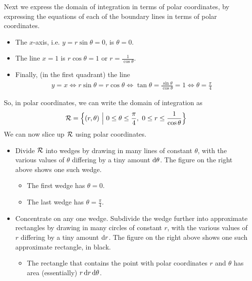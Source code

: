 \begin{eg}
\begin{efig}
\begin{center}
\end{center}
\end{efig}
Next we express the domain of integration in terms of polar coordinates,
by expressing the equations of each of the boundary lines in terms of
polar coordinates.
\begin{itemize}
\item 
The $x$-axis, i.e. $y=r\sin\theta=0$, is $\theta=0$.
\item 
The line $x=1$ is $r\cos\theta=1$ or $r=\frac{1}{\cos\theta}$.
\item
Finally, (in the first quadrant)  the line
\begin{align*}
y=x
\iff
r\sin\theta = r\cos\theta
\iff
\tan\theta=\frac{\sin\theta}{\cos\theta}=1
\iff
\theta=\frac{\pi}{4}
\end{align*}
\end{itemize}
So, in polar coordinates, we can write the domain of integration as
\begin{equation*}
\cR=\Big\{(r,\theta)\ \Big|\ 0\le\theta\le\frac{\pi}{4},\ 
             0\le r\le \frac{1}{\cos\theta}\Big\}
\end{equation*}
We can now slice up $\mathcal{R}$ using polar coordinates.
\begin{itemize}
\item
Divide $\mathcal{R}$ into wedges by drawing in many lines of constant 
$\theta$, with the various values of $\theta$ differing by a tiny 
amount $\mathrm{d}\theta$. The figure on the right above shows one such wedge.
\vspace{-\topsep}
\begin{itemize} \itemsep1pt \parskip0pt 
\item
The first wedge has $\theta=0$.
\item
The last wedge has $\theta=\frac{\pi}{4}$.
\end{itemize}
\vspace{-\topsep}
\item
Concentrate on any one wedge. Subdivide the wedge further into
approximate rectangles by drawing in many circles of constant $r$, 
with the various values of $r$ differing by a tiny amount $\mathrm{d}r$.
The figure on the right above shows one such approximate rectangle, in black.
\vspace{-\topsep}
\begin{itemize} \itemsep1pt \parskip0pt 
\item
The rectangle that contains the point with polar coordinates $r$ and 
$\theta$ has area (essentially) $r\,\mathrm{d}r\,\mathrm{d}\theta$.

\end{itemize}
\end{itemize}
\end{eg}
